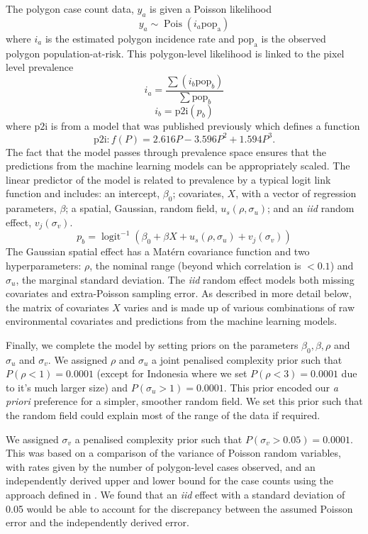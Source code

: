 \documentclass[review]{elsarticle}
\begin{document}
The polygon case count data, $y_a$ is given a Poisson likelihood
$$y_a \sim \operatorname{Pois}(i_a\mathrm{pop_a})$$
where $i_a$ is the estimated polygon incidence rate and $\mathrm{pop_a}$ is the observed polygon population-at-risk. 
This polygon-level likelihood is linked to the pixel level prevalence 
$$i_a = \frac{ \sum(i_b \mathrm{pop}_b)}{\sum  \mathrm{pop}_b} $$
$$i_b = \mathrm{p2i}(p_b)$$
where $\mathrm{p2i}$ is from a model that was published previously \citep{cameron2015defining} which defines a function
$$\mathrm{p2i}: f(P) = 2.616P - 3.596P^2 + 1.594P^3.$$
The fact that the model passes through prevalence space ensures that the predictions from the machine learning models can be appropriately scaled.
The linear predictor of the model is related to prevalence by a typical logit link function and includes: an intercept, $\beta_0$; covariates, $X$, with a vector of regression parameters, $\beta$; a spatial, Gaussian, random field, $u_s(\rho, \sigma_u)$; and an \emph{iid} random effect, $v_j(\sigma_v)$.
$$p_b = \operatorname{logit}^{-1}\left(\beta_0 + \beta X  + u_s\left(\rho, \sigma_u\right) + v_j\left(\sigma_v\right)\right)$$
The Gaussian spatial effect has a Mat\'ern covariance function and two hyperparameters: $\rho$, the nominal range (beyond which correlation is $< 0.1$) and $\sigma_u$, the marginal standard deviation.
The \emph{iid} random effect models both missing covariates and extra-Poisson sampling error.
As described in more detail below, the matrix of covariates $X$ varies and is made up of various combinations of raw environmental covariates and predictions from the machine learning models.

Finally, we complete the model by setting priors on the parameters $\beta_0, \beta, \rho$ and $\sigma_u$ and $\sigma_v$. 
We assigned $\rho$ and $\sigma_u$ a joint penalised complexity prior \citep{fuglstad2018constructing} such that $P(\rho < 1) = 0.0001$ (except for Indonesia where we set $P(\rho < 3) = 0.0001$ due to it's much larger size) and $P(\sigma_u > 1) = 0.0001$. 
This prior encoded our \emph{a priori} preference for a simpler, smoother random field.
We set this prior such that the random field could explain most of the range of the data if required.

We assigned $\sigma_v$ a penalised complexity prior \citep{simpson2017penalising} such that $P(\sigma_v > 0.05) =  0.0001$. 
This was based on a comparison of the variance of Poisson random variables, with rates given by the number of polygon-level cases observed, and an independently derived upper and lower bound for the case counts using the approach defined in \citep{cibulskis2011worldwide}. 
We found that an \emph{iid} effect with a standard deviation of 0.05 would be able to account for the discrepancy between the assumed Poisson error and the independently derived error.
\end{document}
